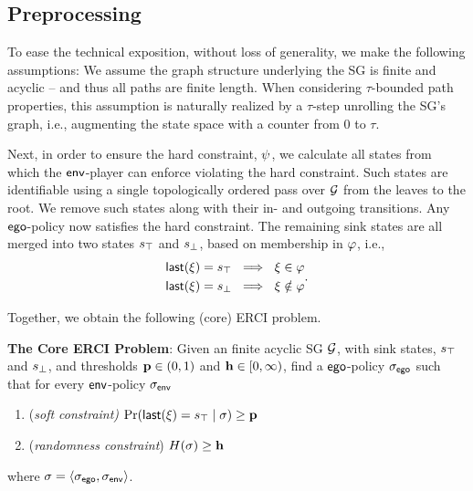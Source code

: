 {{{\subsection{Preprocessing}
To ease the technical exposition, without loss of generality, we make
the following assumptions:
We assume the graph
structure underlying the SG is finite and acyclic -- and thus all paths
are finite length. When considering $\tau$-bounded path properties,
this assumption is naturally realized by a $\tau$-step unrolling the
SG's graph\footnotemark, i.e., augmenting the state space with a counter from $0$ to $\tau$.


Next, in order to ensure the hard constraint, $\psi$, we
calculate all states from which the $\mathsf{env}$-player can enforce
violating the hard constraint. Such states are identifiable using a single
topologically ordered pass over $\mathcal{G}$ from the leaves to the root.  We remove
such states along with their in- and outgoing transitions. Any
$\mathsf{ego}$-policy now satisfies the hard constraint. 
The remaining sink states are all merged into two states $s_{\top}$ and
$s_{\bot}$, based on membership in $\varphi$, i.e.,
\begin{equation}
  \begin{split}
    \mathsf{last}({\xi}) = s_{\top} ~\implies~ \xi \in \varphi\\
    \mathsf{last}({\xi}) = s_{\bot} ~\implies~ \xi \notin \varphi
  \end{split}.
\end{equation}

\noindent 
Together, we obtain the following (core) ERCI problem.
\begin{mdframed}[nobreak=true]
\textbf{The Core ERCI Problem}:
Given an finite acyclic SG $\mathcal{G}$, with sink states, $s_{\top}$ and $s_{\bot}$, and thresholds $\mathbf{p} \in (0,1)$ and $\mathbf{h} \in [0,\infty)$,  find a $\mathsf{ego}$-policy ${\sigma_{\mathsf{ego}}}$  such that for every $\mathsf{env}$-policy ${\sigma_{\mathsf{env}}}$
\begin{enumerate}
\item (\emph{soft constraint)}
  $\Pr(\mathsf{last}({\xi}) = s_{\top} \mid \sigma) \geq \mathbf{p}$
\item (\emph{randomness constraint}) $H(\sigma) \geq \mathbf{h}$
\end{enumerate}
where  $\sigma = \langle {\sigma_{\mathsf{ego}}}, {\sigma_{\mathsf{env}}} \rangle$.
\end{mdframed}

}}}

